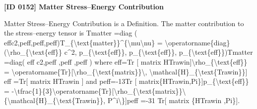 \clearpage
\noindent\textbf{[ID 0152] Matter Stress--Energy Contribution}\par
\vspace{0.35em}
\begingroup\small
{}
Matter Stress--Energy Contribution is a Definition. The matter contribution to the stress--energy tensor is Tmatter  =diag ( effc2,peff,peff,peff)T\_\{\textbackslash{}text\{matter\}\}\textasciicircum{}\{\textbackslash{}mu\textbackslash{}nu\} = \textbackslash{}operatorname\{diag\}(\textbackslash{}rho\_\{\textbackslash{}text\{eff\}\} c\textasciicircum{}2, p\_\{\textbackslash{}text\{eff\}\}, p\_\{\textbackslash{}text\{eff\}\}, p\_\{\textbackslash{}text\{eff\}\})Tmatter   =diag( eff c2,peff ,peff ,peff ) where  eff=Tr [ matrix HTrawin]\textbackslash{}rho\_\{\textbackslash{}text\{eff\}\} = \textbackslash{}operatorname\{Tr\}[\textbackslash{}rho\_\{\textbackslash{}text\{matrix\}\}\textbackslash{}, \textbackslash{}mathcal\{H\}\_\{\textbackslash{}text\{Trawin\}\}] eff =Tr[ matrix HTrawin ] and peff=-13Tr [ matrix\{HTrawin,Pi\}]p\_\{\textbackslash{}text\{eff\}\} = -\textbackslash{}tfrac\{1\}\{3\}\textbackslash{}operatorname\{Tr\}[\textbackslash{}rho\_\{\textbackslash{}text\{matrix\}\}\textbackslash{}\{\textbackslash{}mathcal\{H\}\_\{\textbackslash{}text\{Trawin\}\}, P\textasciicircum{}i\textbackslash{}\}]peff =-31 Tr[ matrix \{HTrawin ,Pi\}].

